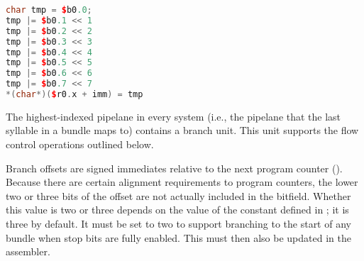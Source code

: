 \begin{lstlisting}[numbers=none, basicstyle=\ttfamily\footnotesize, language=C++]
char tmp = $b0.0;
tmp |= $b0.1 << 1
tmp |= $b0.2 << 2
tmp |= $b0.3 << 3
tmp |= $b0.4 << 4
tmp |= $b0.5 << 5
tmp |= $b0.6 << 6
tmp |= $b0.7 << 7
*(char*)($r0.x + imm) = tmp
\end{lstlisting}

The highest-indexed pipelane in every \rvex{} system (i.e., the pipelane that
the last syllable in a bundle maps to) contains a branch unit. This unit
supports the flow control operations outlined below.

Branch offsets are signed immediates relative to the next program counter
(). Because there are certain alignment requirements to program
counters, the lower two or three bits of the offset are not actually included
in the bitfield. Whether this value is two or three depends on the value of the
 constant defined in ; it
is three by default. It must be set to two to support branching to the start of
any bundle when stop bits are fully enabled. This must then also be updated in
the assembler.

